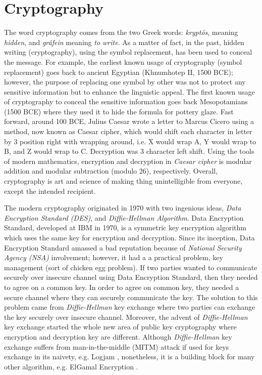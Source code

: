 \section{Cryptography}
    The word cryptography comes from the two Greek words: 
    \textit{krypt\'{o}s}, meaning \textit{hidden}, and \textit{gr\'{a}fein} meaning \textit{to write}. As a matter of 
    fact, in the past, hidden writing (cryptography), using the symbol replacement, has been used 
    to conceal the message. For example,
    the earliest known usage of cryptography (symbol replacement) goes back to  ancient 
    Egyptian (Khnumhotep {\rm II}, 1500 BCE); however, the purpose of replacing one symbol by other 
    was not to protect
    any sensitive information but to enhance the linguistic appeal. The first known usage of 
    cryptography to conceal the sensitive information goes back Mesopotamians (1500 BCE) where 
    they used it to hide the formula for pottery glaze. Fast forward, around 100 BCE, 
    Julius Caesar wrote a letter to Marcus  Cicero using a method, now known 
    as Caesar cipher, which would shift each character in letter by 3 position right with wrapping 
    around, i.e. X would wrap A, Y would wrap to B, and Z would wrap to C. Decryption was 
	3 character left shift.  Using the  tools of modern mathematics, encryption and decryption 
	in \textit{Caesar cipher} is modular addition and modular subtraction (modulo 26), respectively.  
    Overall, cryptography is art and science of making thing  unintelligible from everyone, except the 
    intended recipient.  	
	    
	The modern cryptography originated in 1970 with two ingenious ideas, \textit{Data Encryption Standard (DES)}, 
	and \textit{Diffie-Hellman Algorithm}. Data Encryption Standard, developed at IBM in 1970, is a symmetric 
	key encryption algorithm which uses the same key for encryption and decryption. Since its inception, Data Encryption Standard
	amassed a bad reputation because of \textit{National Security Agency (NSA)} involvement; however, it had a 
	a practical problem, key management (sort of chicken egg problem). If two parties wanted to communicate
	securely over insecure channel using Data Encryption Standard, then they needed to agree on a common key. 
	In order to agree on common key, they needed a secure channel where they can securely communicate the key. 
    The solution to this problem came from \textit{Diffie-Hellman} key exchange where two parties can exchange the 
    key securely over insecure channel. Moreover, the advent of \textit{Diffie-Hellman} key exchange started the 
    whole new area of public key cryptography where encryption and decryption key are different. 
    Although \textit{Diffie-Hellman} key exchange suffers from  man-in-the-middle (MITM)  attack if used for keys exchange in its 
    naivety, e.g. Logjam \citep{Adrian:2015:IFS:2810103.2813707}, nonetheless, 
    it is a building block for many other algorithm, e.g. ElGamal Encryption \citep{elgamal1985public}. 
    
